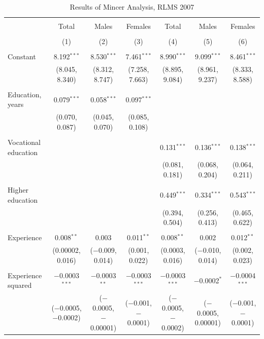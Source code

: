 \documentclass[12pt,a4paper]{article}
\numberwithin{equation}{section}
\begin{document}
\begin{landscape}
	
	\fontsize{9}{11}
	\selectfont
	
	\begin{table}[!htbp] \centering 
		\caption{Results of Mincer Analysis, RLMS 2007} 
		\label{} 
		\begin{tabular}{@{\extracolsep{5pt}}lcccccc} 
			\\[-1.8ex]\hline 
			\hline \\[-1.8ex] 
			& Total & Males & Females & Total & Males & Females \\ 
			\\[-1.8ex] & (1) & (2) & (3) & (4) & (5) & (6)\\ 
			\hline \\[-1.8ex] 
			Constant & 8.192$^{***}$ & 8.530$^{***}$ & 7.461$^{***}$ & 8.990$^{***}$ & 9.099$^{***}$ & 8.461$^{***}$ \\ 
			& (8.045, 8.340) & (8.312, 8.747) & (7.258, 7.663) & (8.895, 9.084) & (8.961, 9.237) & (8.333, 8.588) \\ 
			& & & & & & \\ 
			Education, years & 0.079$^{***}$ & 0.058$^{***}$ & 0.097$^{***}$ &  &  &  \\ 
			& (0.070, 0.087) & (0.045, 0.070) & (0.085, 0.108) &  &  &  \\ 
			& & & & & & \\ 
			Vocational education &  &  &  & 0.131$^{***}$ & 0.136$^{***}$ & 0.138$^{***}$ \\ 
			&  &  &  & (0.081, 0.181) & (0.068, 0.204) & (0.064, 0.211) \\ 
			& & & & & & \\ 
			Higher education &  &  &  & 0.449$^{***}$ & 0.334$^{***}$ & 0.543$^{***}$ \\ 
			&  &  &  & (0.394, 0.504) & (0.256, 0.413) & (0.465, 0.622) \\ 
			& & & & & & \\ 
			Experience & 0.008$^{**}$ & 0.003 & 0.011$^{**}$ & 0.008$^{**}$ & 0.002 & 0.012$^{**}$ \\ 
			& (0.00002, 0.016) & ($-$0.009, 0.014) & (0.001, 0.022) & (0.0003, 0.016) & ($-$0.010, 0.014) & (0.002, 0.023) \\ 
			& & & & & & \\ 
			Experience squared & $-$0.0003$^{***}$ & $-$0.0003$^{**}$ & $-$0.0003$^{***}$ & $-$0.0003$^{***}$ & $-$0.0002$^{*}$ & $-$0.0004$^{***}$ \\ 
			& ($-$0.0005, $-$0.0002) & ($-$0.0005, $-$0.00001) & ($-$0.001, $-$0.0001) & ($-$0.0005, $-$0.0002) & ($-$0.0005, 0.00001) & ($-$0.001, $-$0.0001) \\ 

\end{tabular}
\end{table}
\end{landscape}
\end{document}
